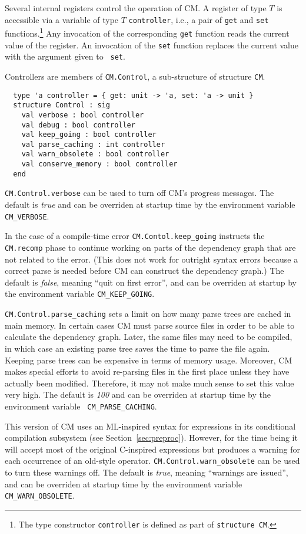 \documentclass[titlepage,letterpaper]{article}
\begin{document}
Several internal registers control the operation of CM.  A register of
type $T$ is accessible via a variable of type $T$ {\tt controller},
i.e., a pair of {\tt get} and {\tt set} functions.\footnote{The type
constructor {\tt controller} is defined as part of {\tt structure
CM}.}  Any invocation of the corresponding {\tt get} function reads
the current value of the register.  An invocation of the {\tt set}
function replaces the current value with the argument given to {\tt
set}.

Controllers are members of {\tt CM.Control}, a sub-structure of
structure {\tt CM}.

\begin{verbatim}
  type 'a controller = { get: unit -> 'a, set: 'a -> unit }
  structure Control : sig
    val verbose : bool controller
    val debug : bool controller
    val keep_going : bool controller
    val parse_caching : int controller
    val warn_obsolete : bool controller
    val conserve_memory : bool controller
  end
\end{verbatim}

{\tt CM.Control.verbose} can be used to turn off CM's progress
messages.  The default is {\em true} and can be overriden at startup
time by the environment variable {\tt CM\_VERBOSE}.

In the case of a compile-time error {\tt CM.Contol.keep\_going}
instructs the {\tt CM.recomp} phase to continue working on parts of
the dependency graph that are not related to the error.  (This does
not work for outright syntax errors because a correct parse is needed
before CM can construct the dependency graph.)  The default is {\em
false}, meaning ``quit on first error'', and can be overriden at
startup by the environment variable {\tt CM\_KEEP\_GOING}.

{\tt CM.Control.parse\_caching} sets a limit on how many parse trees
are cached in main memory.  In certain cases CM must parse source
files in order to be able to calculate the dependency graph.  Later,
the same files may need to be compiled, in which case an existing
parse tree saves the time to parse the file again.  Keeping parse
trees can be expensive in terms of memory usage.  Moreover, CM makes
special efforts to avoid re-parsing files in the first place unless
they have actually been modified.  Therefore, it may not make much
sense to set this value very high.  The default is {\em 100} and can
be overriden at startup time by the environment variable {\tt
CM\_PARSE\_CACHING}.

This version of CM uses an ML-inspired syntax for expressions in its
conditional compilation subsystem (see Section~\ref{sec:preproc}).
However, for the time being it will accept most of the original
C-inspired expressions but produces a warning for each occurrence of
an old-style operator. {\tt CM.Control.warn\_obsolete} can be used to
turn these warnings off. The default is {\em true}, meaning ``warnings
are issued'', and can be overriden at startup time by the environment
variable {\tt CM\_WARN\_OBSOLETE}.
\end{document}
